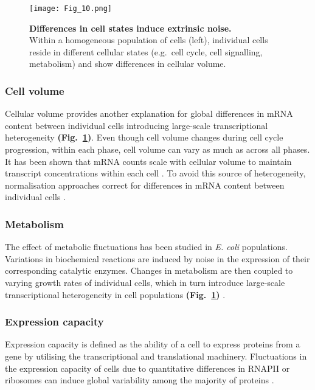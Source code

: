 \begin{figure}[!h]
\centering
\texttt{[image: Fig\_10.png]}
\caption[Differences in cell states induce extrinsic noise]{\textbf{Differences in cell states induce extrinsic noise.}\\
Within a homogeneous population of cells (left), individual cells reside in different cellular states (e.g.~cell cycle, cell signalling, metabolism) and show differences in cellular volume.}
\label{fig0:extrinsic}
\end{figure} 

\vspace{-5mm}

\subsubsection{Cell volume}

Cellular volume provides another explanation for global differences in mRNA content between individual cells introducing large-scale transcriptional heterogeneity \textbf{(Fig.~\ref{fig0:extrinsic})}. 
Even though cell volume changes during cell cycle progression, within each phase, cell volume can vary as much as across all phases. 
It has been shown that mRNA counts scale with cellular volume to maintain transcript concentrations within each cell \citep{Kempe2015, Padovan-Merhar2015, Zhurinsky2010}. 
To avoid this source of heterogeneity, normalisation approaches correct for differences in mRNA content between individual cells \citep{Vallejos2017}.

\subsubsection{Metabolism}

The effect of metabolic fluctuations has been studied in \textit{E. coli} populations. Variations in biochemical reactions are induced by noise in the expression of their corresponding catalytic enzymes. 
Changes in metabolism are then coupled to varying growth rates of individual cells, which in turn introduce large-scale transcriptional heterogeneity in cell populations \textbf{(Fig.~\ref{fig0:extrinsic})} \citep{Kiviet2014}.  

\subsubsection{Expression capacity}

Expression capacity is defined as the ability of a cell to express proteins from a gene by utilising the transcriptional and translational machinery. 
Fluctuations in the expression capacity of cells due to quantitative differences in RNAPII or ribosomes can induce global variability among the majority of proteins \citep{Colman-Lerner2005}.

